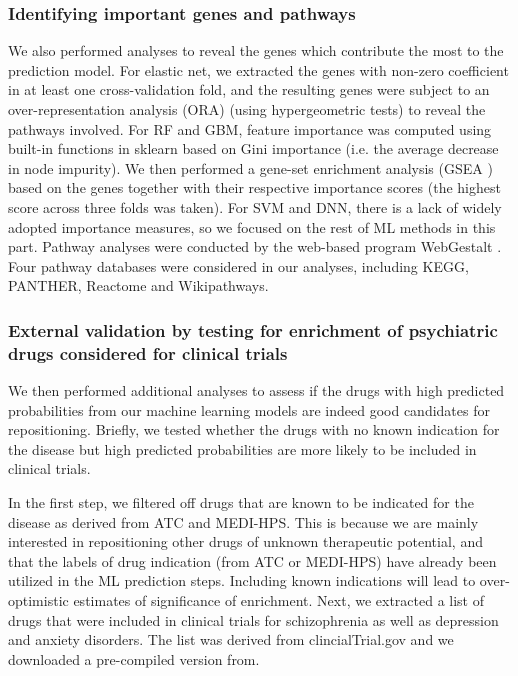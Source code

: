     \subsubsection{Identifying important genes and pathways}
      We also performed analyses to reveal the genes which contribute the most to the prediction model. For elastic net, we extracted the genes with non-zero coefficient in at least one cross-validation fold, and the resulting genes were subject to an over-representation analysis (ORA) (using hypergeometric tests) to reveal the pathways involved. For RF and GBM, feature importance was computed using built-in functions in sklearn based on Gini importance (i.e. the average decrease in node impurity). We then performed a gene-set enrichment analysis (GSEA \cite{subramanian2005gene}) based on the genes together with their respective importance scores (the highest score across three folds was taken). For SVM and DNN, there is a lack of widely adopted importance measures, so we focused on the rest of ML methods in this part. Pathway analyses were conducted by the web-based program WebGestalt \cite{wang2017webgestalt}. Four pathway databases were considered in our analyses, including KEGG, PANTHER, Reactome and Wikipathways.
    
    \subsubsection{External validation by testing for enrichment of psychiatric drugs considered for clinical trials}
      We then performed additional analyses to assess if the drugs with high predicted probabilities from our machine learning models are indeed good candidates for repositioning. Briefly, we tested whether the drugs with no known indication for the disease but high predicted probabilities are more likely to be included in clinical trials. 

      In the first step, we filtered off drugs that are known to be indicated for the disease as derived from ATC and MEDI-HPS. This is because we are mainly interested in repositioning other drugs of unknown therapeutic potential, and that the labels of drug indication (from ATC or MEDI-HPS) have already been utilized in the ML prediction steps. Including known indications will lead to over-optimistic estimates of significance of enrichment. Next, we extracted a list of drugs that were included in clinical trials for schizophrenia as well as depression and anxiety disorders. The list was derived from clincialTrial.gov and we downloaded a pre-compiled version from.

